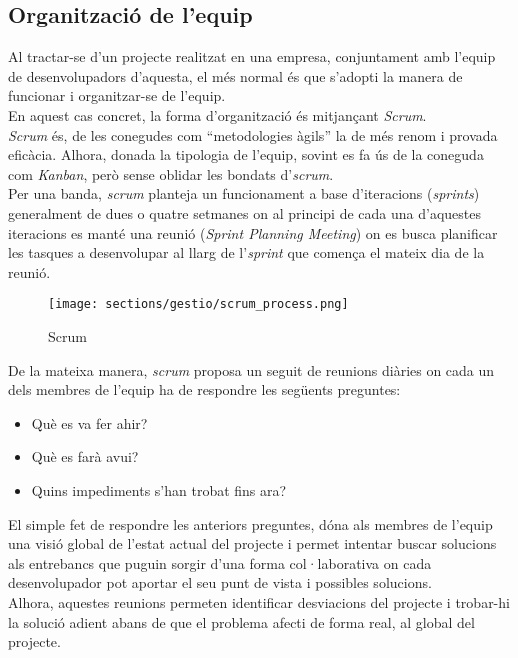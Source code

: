 \subsection{Organització de l'equip}
\label{metodologia:oranitzacio_equip}
Al tractar-se d'un projecte realitzat en una empresa, conjuntament amb l'equip de desenvolupadors d'aquesta, el més normal és que s'adopti la manera de funcionar i organitzar-se de l'equip.\\
En aquest cas concret, la forma d'organització és mitjançant \textit{Scrum}.\\
\newline \textit{Scrum} és, de les conegudes com ``metodologies àgils'' la de més renom i provada eficàcia. Alhora, donada la tipologia de l'equip, sovint es fa ús de la coneguda com \textit{Kanban}, però sense oblidar les bondats d'\textit{scrum}.\\
\newline Per una banda, \textit{scrum} planteja un funcionament a base d'iteracions (\textit{sprints}) generalment de dues o quatre setmanes on al principi de cada una d'aquestes iteracions es manté una reunió (\textit{Sprint Planning Meeting}) on es busca planificar les tasques a desenvolupar al llarg de l'\textit{sprint} que comença el mateix dia de la reunió.
\begin{figure}[h]
\texttt{[image: sections/gestio/scrum\_process.png]}
\centering
\caption{Scrum}
\label{fig:scrum}
\end{figure}
\newline De la mateixa manera, \textit{scrum} proposa un seguit de reunions diàries on cada un dels membres de l'equip ha de respondre les següents preguntes:
\begin{itemize}
	\item Què es va fer ahir?
	\item Què es farà avui?
	\item Quins impediments s'han trobat fins ara?
\end{itemize}
El simple fet de respondre les anteriors preguntes, dóna als membres de l'equip una visió global de l'estat actual del projecte i permet intentar buscar solucions als entrebancs que puguin sorgir d'una forma col·laborativa on cada desenvolupador pot aportar el seu punt de vista i possibles solucions.\\
\newline Alhora, aquestes reunions permeten identificar desviacions del projecte i trobar-hi la solució adient abans de que el problema afecti de forma real, al global del projecte.\\
